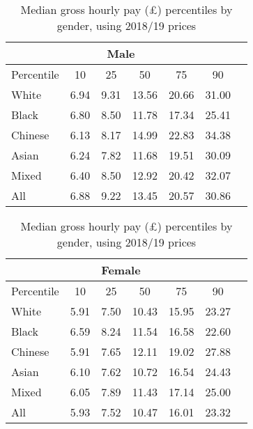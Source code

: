 \begin{table}[htbp]\centering
\def\sym#1{\ifmmode^{#1}\else\(^{#1}\)\fi}
\caption{Median gross hourly pay (£) percentiles by gender, using 2018/19 prices}
\begin{tabular}{l*{6}{c}}
\hline\hline
\multicolumn{6}{c}{Male}\\
\hline\hline
Percentile&10&25&50&75&90 \\
\hline
White&6.94&9.31&13.56&20.66&31.00 \\
Black&6.80&8.50&11.78&17.34&25.41 \\
Chinese&6.13&8.17&14.99&22.83&34.38 \\
Asian&6.24&7.82&11.68&19.51&30.09 \\
Mixed&6.40&8.50&12.92&20.42&32.07 \\
All&6.88&9.22&13.45&20.57&30.86 \\
\hline\hline
\end{tabular}
\begin{tabular}{l*{6}{c}}
\hline\hline
\multicolumn{6}{c}{Female}\\
\hline\hline
Percentile&10&25&50&75&90 \\
\hline
White&5.91&7.50&10.43&15.95&23.27 \\
Black&6.59&8.24&11.54&16.58&22.60 \\
Chinese&5.91&7.65&12.11&19.02&27.88 \\
Asian&6.10&7.62&10.72&16.54&24.43 \\
Mixed&6.05&7.89&11.43&17.14&25.00 \\
All&5.93&7.52&10.47&16.01&23.32 \\
\hline\hline
\end{tabular}

\label{tab:hourly_percentiles}
\end{table}
